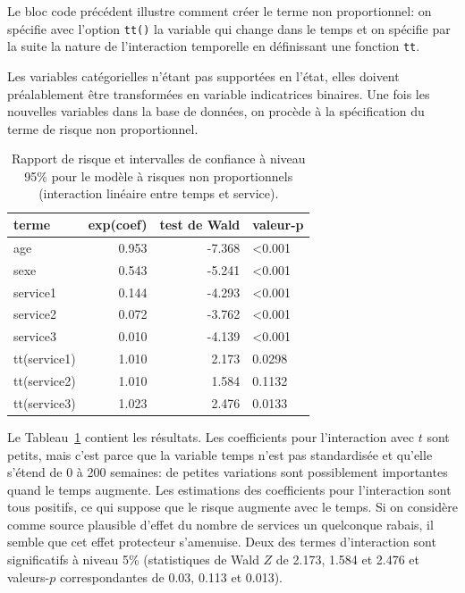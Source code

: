 \documentclass[
  11pt,
  letterpaper,
]{book}
\theoremstyle{definition}
\theoremstyle{remark}
\begin{document}
Le bloc code précédent illustre comment créer le terme non
proportionnel: on spécifie avec l'option \texttt{tt()} la variable qui
change dans le temps et on spécifie par la suite la nature de
l'interaction temporelle en définissant une fonction \texttt{tt}.

Les variables catégorielles n'étant pas supportées en l'état, elles
doivent préalablement être transformées en variable indicatrices
binaires. Une fois les nouvelles variables dans la base de données, on
procède à la spécification du terme de risque non proportionnel.

\hypertarget{tbl-coxnph}{}
\begin{table}
\caption{\label{tbl-coxnph}Rapport de risque et intervalles de confiance à niveau 95\% pour le
modèle à risques non proportionnels (interaction linéaire entre temps et
service). }\tabularnewline

\centering
\begin{tabular}{lrrl}
\toprule
terme & exp(coef) & test de Wald & valeur-p\\
\midrule
age & 0.953 & -7.368 & <0.001\\
sexe & 0.543 & -5.241 & <0.001\\
service1 & 0.144 & -4.293 & <0.001\\
service2 & 0.072 & -3.762 & <0.001\\
service3 & 0.010 & -4.139 & <0.001\\
\addlinespace
tt(service1) & 1.010 & 2.173 & 0.0298\\
tt(service2) & 1.010 & 1.584 & 0.1132\\
tt(service3) & 1.023 & 2.476 & 0.0133\\
\bottomrule
\end{tabular}
\end{table}

Le Tableau~\ref{tbl-coxnph} contient les résultats. Les coefficients
pour l'interaction avec \(t\) sont petits, mais c'est parce que la
variable temps n'est pas standardisée et qu'elle s'étend de 0 à 200
semaines: de petites variations sont possiblement importantes quand le
temps augmente. Les estimations des coefficients pour l'interaction sont
tous positifs, ce qui suppose que le risque augmente avec le temps. Si
on considère comme source plausible d'effet du nombre de services un
quelconque rabais, il semble que cet effet protecteur s'amenuise. Deux
des termes d'interaction sont significatifs à niveau 5\% (statistiques
de Wald \(Z\) de 2.173, 1.584 et 2.476 et valeurs-\(p\) correspondantes
de 0.03, 0.113 et 0.013).
\end{document}

